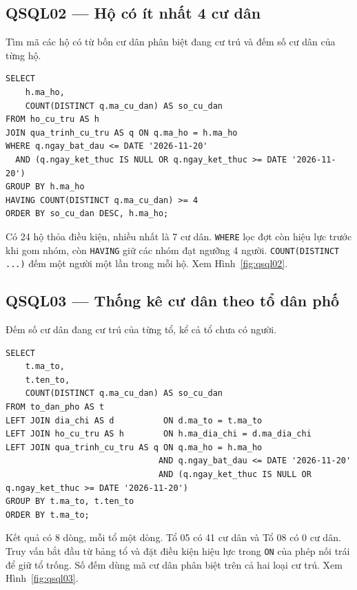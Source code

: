 \noindent\begin{minipage}{\linewidth}
\subsection*{QSQL02 --- Hộ có ít nhất 4 cư dân}

Tìm mã các hộ có từ bốn cư dân phân biệt đang cư trú và đếm số cư dân của từng hộ.

\begin{lstlisting}[style=sqlvn]
SELECT
    h.ma_ho,
    COUNT(DISTINCT q.ma_cu_dan) AS so_cu_dan
FROM ho_cu_tru AS h
JOIN qua_trinh_cu_tru AS q ON q.ma_ho = h.ma_ho
WHERE q.ngay_bat_dau <= DATE '2026-11-20'
  AND (q.ngay_ket_thuc IS NULL OR q.ngay_ket_thuc >= DATE '2026-11-20')
GROUP BY h.ma_ho
HAVING COUNT(DISTINCT q.ma_cu_dan) >= 4
ORDER BY so_cu_dan DESC, h.ma_ho;
\end{lstlisting}

Có 24 hộ thỏa điều kiện, nhiều nhất là 7 cư dân. \texttt{WHERE} lọc đợt còn hiệu lực trước khi gom nhóm, còn \texttt{HAVING} giữ các nhóm đạt ngưỡng 4 người. \texttt{COUNT(DISTINCT ...)} đếm một người một lần trong mỗi hộ. Xem Hình~\ref{fig:qsql02}.
\end{minipage}\par\medskip

\noindent\begin{minipage}{\linewidth}
\subsection*{QSQL03 --- Thống kê cư dân theo tổ dân phố}

Đếm số cư dân đang cư trú của từng tổ, kể cả tổ chưa có người.

\begin{lstlisting}[style=sqlvn]
SELECT
    t.ma_to,
    t.ten_to,
    COUNT(DISTINCT q.ma_cu_dan) AS so_cu_dan
FROM to_dan_pho AS t
LEFT JOIN dia_chi AS d          ON d.ma_to = t.ma_to
LEFT JOIN ho_cu_tru AS h        ON h.ma_dia_chi = d.ma_dia_chi
LEFT JOIN qua_trinh_cu_tru AS q ON q.ma_ho = h.ma_ho
                               AND q.ngay_bat_dau <= DATE '2026-11-20'
                               AND (q.ngay_ket_thuc IS NULL OR q.ngay_ket_thuc >= DATE '2026-11-20')
GROUP BY t.ma_to, t.ten_to
ORDER BY t.ma_to;
\end{lstlisting}

Kết quả có 8 dòng, mỗi tổ một dòng. Tổ 05 có 41 cư dân và Tổ 08 có 0 cư dân. Truy vấn bắt đầu từ bảng tổ và đặt điều kiện hiệu lực trong \texttt{ON} của phép nối trái để giữ tổ trống. Số đếm dùng mã cư dân phân biệt trên cả hai loại cư trú. Xem Hình~\ref{fig:qsql03}.
\end{minipage}\par\medskip

